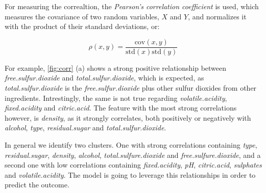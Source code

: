 \documentclass[11pt,twoside]{article}
\numberwithin{Theorem}{section}
\numberwithin{Definition}{section}
\numberwithin{Lemma}{section}
\numberwithin{Algorithm}{section}
\numberwithin{equation}{section}
\begin{document}
For measuring the correaltion, the \textit{Pearson's correlation coefficient} is used, which measures the covariance of two random variables, $X$ and $Y$, and normalizes it with the product of their standard deviations, or:

\begin{equation}
\rho(x,y) = \frac{\text{cov}(x,y)}{\text{std}(x)\text{std}(y)}
\end{equation}

\begin{figure}[h]
    \centering
    \caption{}
    \label{fig:corr}
\end{figure}

For example, \autoref{fig:corr} (a) shows a strong positive relationship between \textit{free.sulfur.dioxide} and \textit{total.sulfur.dioxide}, which is expected, as \textit{total.sulfur.dioxide} is the \textit{free.sulfur.dioxide} plus other sulfur dioxides from other ingredients. Intrestingly, the same is not true regarding \textit{volatile.acidity}, \textit{fixed.acidity} and \textit{citric.acid}. The feature with the most strong correlations however, is \textit{density}, as it strongly correlates, both positively or negatively with \textit{alcohol}, \textit{type}, \textit{residual.sugar} and \textit{total.sulfur.dioxide}. 

In general we identify two clusters. One with strong correlations containing \textit{type}, \textit{residual.sugar}, \textit{density}, \textit{alcohol}, \textit{total.sulfure.dioxide} and \textit{free.sulfure.dioxide}, and a second one with low correlations containing \textit{fixed.acidity}, \textit{pH}, \textit{citric.acid}, \textit{sulphates} and \textit{volatile.acidity}. The model is going to leverage this relationships in order to predict the outcome. 
\end{document}
